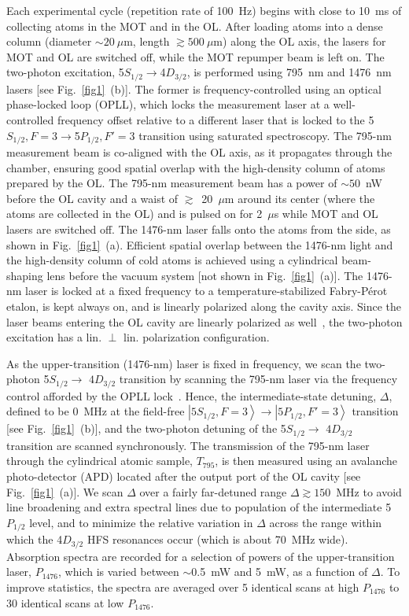 \documentclass[reprint, amsmath,amssymb, aps, pra, longbibliography]{revtex4-1}
\newcommand{\ket}[1]{\ensuremath{\left\vert #1 \right\rangle}}
\begin{document}
Each experimental cycle (repetition rate of 100~Hz) begins with close to 10~ms of collecting atoms in the MOT and in the OL.
After loading atoms into a dense column (diameter $\sim 20~\mu$m, length $\gtrsim 500~\mu$m) along the OL axis,
the lasers for MOT and OL are switched off, while the MOT repumper beam is left on. The two-photon excitation, 5$S_{1/2}\rightarrow$4$D_{3/2}$, is performed using 795~nm and 1476~nm lasers [see Fig.~\ref{fig1}~(b)]. The former is frequency-controlled using an optical phase-locked loop (OPLL), 
which locks the measurement laser at a well-controlled frequency offset relative to a different 
laser that is locked to the 5$S_{1/2}, F=3 \rightarrow$5$P_{1/2}, F'=3$ transition using saturated spectroscopy. The 795-nm measurement beam is co-aligned with the OL axis, as it propagates through the chamber, ensuring good spatial overlap with the high-density column of atoms prepared by the OL. The 795-nm measurement beam has a power of $\sim 50$~nW before the OL cavity and a waist of $\gtrsim$~20~$\mu$m around its center (where the atoms are collected in the OL) and is pulsed on for 2~$\mu$s while MOT and OL lasers are switched off.
The 1476-nm laser falls onto the atoms from the side, as shown in Fig.~\ref{fig1}~(a). Efficient spatial overlap between the 1476-nm light and the high-density column of cold atoms is achieved using a cylindrical beam-shaping lens before the vacuum system [not shown in Fig.~\ref{fig1}~(a)]. The 
1476-nm laser is locked at a fixed frequency to a temperature-stabilized Fabry-P\'erot etalon, is kept always on, and is linearly polarized along the cavity axis. Since 
the laser beams entering the OL cavity are linearly polarized as well~\cite{atoms10040117}, the two-photon excitation has a  lin. $\perp$ lin. polarization configuration.

As the upper-transition (1476-nm) laser is fixed in
frequency, we scan the two-photon 5$S_{1/2} \rightarrow$ $4D_{3/2}$ transition by scanning the 795-nm laser via the frequency control afforded by the OPLL lock~\cite{cardman2021}. Hence, the intermediate-state detuning, $\Delta$, defined to be 0~MHz at the field-free $\ket{5S_{1/2}, F = 3} \rightarrow \ket{5P_{1/2}, F' = 3}$ transition [see Fig.~\ref{fig1}~(b)], and the two-photon detuning of the  5$S_{1/2} \rightarrow$ $4D_{3/2}$ transition are scanned synchronously. The transmission of the 795-nm laser through the cylindrical atomic sample, $T_{795}$, is then measured using an avalanche photo-detector (APD) located after the output port of the OL cavity [see Fig.~\ref{fig1}~(a)]. We scan $\Delta$ over a fairly far-detuned range $\Delta \gtrsim 150$~MHz to avoid line broadening and extra spectral lines due to population of the intermediate 5$P_{1/2}$ level, and to minimize the relative variation in $\Delta$ across the range within which the 4$D_{3/2}$ HFS resonances occur (which is about 70~MHz wide). Absorption spectra are recorded for a selection of powers of the upper-transition laser, $P_{1476}$, which is varied between $\sim$0.5~mW and 5~mW, as a function of $\Delta$. To improve statistics, the spectra are averaged over 5 identical scans at high $P_{1476}$ to 30 identical scans at low $P_{1476}$.
\end{document}
